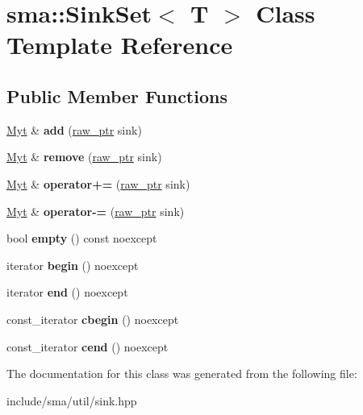 \hypertarget{classsma_1_1SinkSet}{\section{sma\-:\-:Sink\-Set$<$ T $>$ Class Template Reference}
\label{classsma_1_1SinkSet}
}
\subsection*{Public Member Functions}
\begin{DoxyCompactItemize}
\item 
\hypertarget{classsma_1_1SinkSet_a32ecf9a69212dcb1942a4fa9cf8c68e8}{\hyperlink{classsma_1_1SinkSet}{Myt} \& {\bfseries add} (\hyperlink{classsma_1_1Sink}{raw\-\_\-ptr} sink)}\label{classsma_1_1SinkSet_a32ecf9a69212dcb1942a4fa9cf8c68e8}

\item 
\hypertarget{classsma_1_1SinkSet_af73ca6b20d9957c5e157ed9b87c0bb74}{\hyperlink{classsma_1_1SinkSet}{Myt} \& {\bfseries remove} (\hyperlink{classsma_1_1Sink}{raw\-\_\-ptr} sink)}\label{classsma_1_1SinkSet_af73ca6b20d9957c5e157ed9b87c0bb74}

\item 
\hypertarget{classsma_1_1SinkSet_ae9909a404b397016c9ab3621aaa3d0a2}{\hyperlink{classsma_1_1SinkSet}{Myt} \& {\bfseries operator+=} (\hyperlink{classsma_1_1Sink}{raw\-\_\-ptr} sink)}\label{classsma_1_1SinkSet_ae9909a404b397016c9ab3621aaa3d0a2}

\item 
\hypertarget{classsma_1_1SinkSet_a963881b8c62448378b7555e1d662ca3c}{\hyperlink{classsma_1_1SinkSet}{Myt} \& {\bfseries operator-\/=} (\hyperlink{classsma_1_1Sink}{raw\-\_\-ptr} sink)}\label{classsma_1_1SinkSet_a963881b8c62448378b7555e1d662ca3c}

\item 
\hypertarget{classsma_1_1SinkSet_a982b3fb72398a705a871fe7accb6eb57}{bool {\bfseries empty} () const noexcept}\label{classsma_1_1SinkSet_a982b3fb72398a705a871fe7accb6eb57}

\item 
\hypertarget{classsma_1_1SinkSet_a6bbf70add156fcec29f12bdc52f6e0ea}{iterator {\bfseries begin} () noexcept}\label{classsma_1_1SinkSet_a6bbf70add156fcec29f12bdc52f6e0ea}

\item 
\hypertarget{classsma_1_1SinkSet_a911b751c1ee8a43da99d6458b001ae06}{iterator {\bfseries end} () noexcept}\label{classsma_1_1SinkSet_a911b751c1ee8a43da99d6458b001ae06}

\item 
\hypertarget{classsma_1_1SinkSet_ab1dc643655b5577e35b681d29e92adcd}{const\-\_\-iterator {\bfseries cbegin} () noexcept}\label{classsma_1_1SinkSet_ab1dc643655b5577e35b681d29e92adcd}

\item 
\hypertarget{classsma_1_1SinkSet_ad1f307300a83e5411ee7710f2ca90c3a}{const\-\_\-iterator {\bfseries cend} () noexcept}\label{classsma_1_1SinkSet_ad1f307300a83e5411ee7710f2ca90c3a}

\end{DoxyCompactItemize}


The documentation for this class was generated from the following file\-:\begin{DoxyCompactItemize}
\item 
include/sma/util/sink.\-hpp\end{DoxyCompactItemize}
